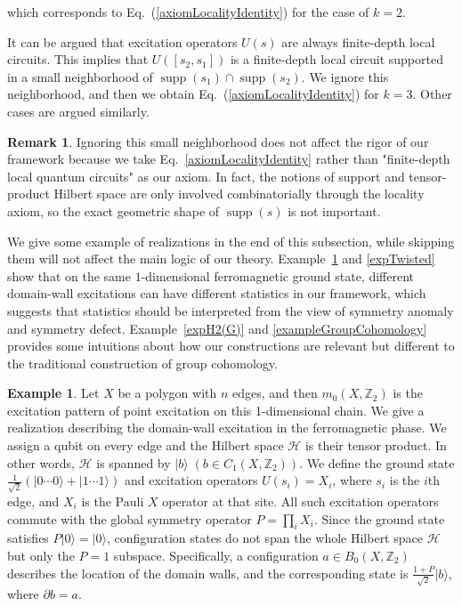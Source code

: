 \documentclass[reprint, amsmath, amssymb, showpacs, floatfix, longbibliography, aps, twocolumn, superscriptaddress, nofootinbib]{revtex4-2}
\newcommand{\ZZ}{{\mathbb Z}}
\newcommand{\supp}{\operatorname{supp}}
\theoremstyle{definition}
\newtheorem{example}{Example}[section]
\newtheorem{remark}{Remark}[section]
\begin{document}
which corresponds to Eq.~(\ref{axiomLocalityIdentity}) for the case of \(k=2\).

It can be argued that excitation operators \( U(s)\) are always finite-depth local circuits. This implies that $ U([s_2,s_1])$ is a finite-depth local circuit supported in a small neighborhood of  \(\operatorname{supp}(s_1) \cap \operatorname{supp}(s_2)\). We ignore this neighborhood, and then we obtain Eq.~(\ref{axiomLocalityIdentity}) for $k=3$. Other cases are argued similarly. 

\begin{remark}\label{remarkCombinationData}
Ignoring this small neighborhood does not affect the rigor of our framework because we take Eq.~\eqref{axiomLocalityIdentity} rather than "finite-depth local quantum circuits" as our axiom. In fact, the notions of support and tensor-product Hilbert space are only involved combinatorially through the locality axiom, so the exact geometric shape of $\supp(s)$ is not important.
\end{remark}

We give some example of realizations in the end of this subsection, while skipping them will not affect the main logic of our theory. Example~\ref{expTrivialFSymbol} and \ref{expTwisted} show that on the same $1$-dimensional ferromagnetic ground state, different domain-wall excitations can have different statistics in our framework, which suggests that statistics should be interpreted from the view of symmetry anomaly and symmetry defect.
 Example~\ref{expH2(G)} and \ref{exampleGroupCohomology} provides some intuitions about how our constructions are relevant but different to the traditional construction of group cohomology.

\begin{example}\label{expTrivialFSymbol}
	Let $X$ be a polygon with $n$ edges, and then $m_0(X,\ZZ_2)$ is the excitation pattern of point excitation on this 1-dimensional chain. We give a realization describing the domain-wall excitation in the ferromagnetic phase. We assign a qubit on every edge and the Hilbert space $\mathcal{H}$ is their tensor product. In other words, $\mathcal{H}$ is spanned by $|b\rangle\;(b\in C_1(X,\ZZ_2))$. We define the ground state  $\frac{1}{\sqrt{2}}(|0\cdots0\rangle+|1\cdots1\rangle)$ and  excitation operators $ U(s_i)=X_i$, where $s_i$ is the $i$th edge, and $X_i$ is the Pauli $X$ operator at that site. All such excitation operators commute with the global symmetry operator $P=\prod_{i}X_i$. Since the ground state satisfies $P|0\rangle=|0\rangle$, configuration states do not span the whole Hilbert space $\mathcal{H}$ but only the $P=1$ subspace. Specifically, a configuration $a\in B_0(X,\ZZ_2)$ describes the location of the domain walls, and the corresponding state is $\frac{1+P}{\sqrt{2}}|b\rangle$, where $\partial b=a$.
\end{example}
\end{document}
